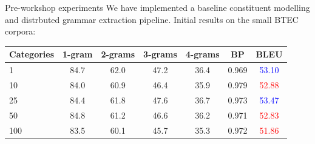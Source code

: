 \documentclass{beamer}
\newenvironment{unpacked_itemize}{
\begin{itemize}
  \setlength{\itemsep}{10pt}
  \setlength{\parskip}{0pt}
  \setlength{\parsep}{0pt}
}{\end{itemize}}
\begin{document}
\begin{frame}[t]{Pre-workshop experiments}
\vspace{0.25in}
We have implemented a baseline constituent modelling and distrbuted grammar extraction pipeline. Initial results on the small BTEC corpora:

\vspace{0.25in}
\begin{exampleblock}
\footnotesize
\centering
\begin{tabular}{lcccccc}
\toprule
Categories & \small 1-gram & \small 2-grams & \small 3-grams & \small 4-grams & \small BP  &  BLEU  \\
\midrule                                                                                            
1          & \small 84.7 & \small 62.0    & \small 47.2    & \small 36.4    & \small 0.969 &  \textcolor{blue}{53.10} \\
10         & \small 84.0 & \small 60.9    & \small 46.4    & \small 35.9    & \small 0.979 &  \textcolor{red}{52.88} \\
25         & \small 84.4 & \small 61.8    & \small 47.6    & \small 36.7    & \small 0.973 &  \textcolor{blue}{53.47} \\
50         & \small 84.8 & \small 61.2    & \small 46.6    & \small 36.2    & \small 0.971 &  \textcolor{red}{52.83} \\
100        & \small 83.5 & \small 60.1    & \small 45.7    & \small 35.3    & \small 0.972 &  \textcolor{red}{51.86} \\
\bottomrule
\end{tabular}
\end{exampleblock}
\end{frame}


\end{document}
